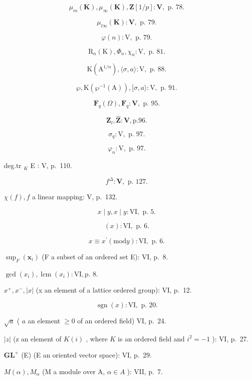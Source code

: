 \[
\mu_ {m} (\mathbf {K}), \mu_ {\infty} (\mathbf {K}), \mathbf {Z} [ 1 / p ]: \mathbf {V}, \text {   p.   } 78.
\]

\[
\mu_ {l\infty} (\mathbf {K}): \mathbf {V}, \text { p. } 79.
\]

\[
\varphi (n): \mathrm{V}, \text { p. } 79.
\]

\[
\mathrm{R} _ {n} (\mathrm{K}), \Phi_ {n}, \chi_ {n}: \mathrm{V}, \text { p. } 81.
\]

\[
\mathrm{K} \left(\mathrm{A} ^ {1 / n}\right), \langle \sigma , a \rangle : \mathrm{V}, \text { p. } 88.
\]

\[
\wp , \mathrm{K} (\wp^ {- 1} (\mathrm{A})), [ \sigma , a \rangle : \mathrm{V}, \text { p. } 91.
\]

\[
\mathbf {F} _ {q} (\Omega), \mathbf {F} _ {q}: \mathbf {V}, \text { p. } 95.
\]

\[
\mathbf {Z} _ {l}, \hat {\mathbf {Z}}: \mathbf {V}, \mathrm{p.} 96.
\]

\[
\sigma_ {q}: \mathrm{V}, \text { p. } 97.
\]

\[
\varphi_ {n}: \mathrm{V}, \text { p. } 97.
\]

deg.tr \(_{K}\) E : V, p.~110.

\[
f ^ {\Delta}: \mathbf {V}, \text { p. } 127.
\]

\(\chi(f), f\) a linear mapping: V, p.~132.

\[
x \mid y, x \mid y: \mathrm{VI}, \text { p. } 5.
\]

\[
(x): \mathrm{VI}, \text { p. } 6.
\]

\[
x \equiv x ^ {\prime} (\mathrm{mod} y): \mathrm{VI}, \text { p. } 6.
\]

\(\sup_{F}(\mathbf{x}_{i})\) (F a subset of an ordered set E): VI, p.~8.

\(\gcd (x_{i}), \operatorname{lcm}(x_{i}) : \mathrm{VI}, \text{p. 8.}\)

\(x^{+}, x^{-}, |x|\) (x an element of a lattice ordered group): VI, p.~12.

\[
\operatorname{sgn} (x): \mathrm{VI}, \text { p. } 20.
\]

\(\sqrt{a}\) ( \(a\) an element \(\geqslant 0\) of an ordered field) VI, p.~24.

\(|z|\) (z an element of \(K(i)\) , where \(K\) is an ordered field and \(i^2 = -1\) ): VI, p.~27.

\(\mathbf{GL}^{+}\) (E) (E an oriented vector space): VI, p.~29.

\(M(\alpha), M_{\alpha}\) (M a module over A, \(\alpha \in A\) ): VII, p.~7.

